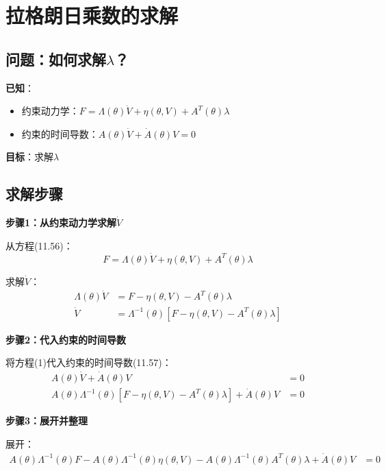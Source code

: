 \documentclass[12pt,a4paper]{article}
\begin{document}
\section{拉格朗日乘数的求解}

\subsection{问题：如何求解$\lambda$？}

\textbf{已知}：
\begin{itemize}
\item 约束动力学：$F = \Lambda(\theta)\dot{V} + \eta(\theta, V) + A^T(\theta)\lambda$
\item 约束的时间导数：$A(\theta)\dot{V} + \dot{A}(\theta)V = 0$
\end{itemize}

\textbf{目标}：求解$\lambda$

\subsection{求解步骤}

\textbf{步骤1：从约束动力学求解$\dot{V}$}

从方程(11.56)：
\begin{equation}
F = \Lambda(\theta)\dot{V} + \eta(\theta, V) + A^T(\theta)\lambda
\end{equation}

求解$\dot{V}$：
\begin{align}
\Lambda(\theta)\dot{V} &= F - \eta(\theta, V) - A^T(\theta)\lambda \\
\dot{V} &= \Lambda^{-1}(\theta)[F - \eta(\theta, V) - A^T(\theta)\lambda] \tag{1}
\end{align}

\textbf{步骤2：代入约束的时间导数}

将方程(1)代入约束的时间导数(11.57)：
\begin{align}
A(\theta)\dot{V} + \dot{A}(\theta)V &= 0 \\
A(\theta)\Lambda^{-1}(\theta)[F - \eta(\theta, V) - A^T(\theta)\lambda] + \dot{A}(\theta)V &= 0
\end{align}

\textbf{步骤3：展开并整理}

展开：
\begin{align}
A(\theta)\Lambda^{-1}(\theta)F - A(\theta)\Lambda^{-1}(\theta)\eta(\theta, V) - A(\theta)\Lambda^{-1}(\theta)A^T(\theta)\lambda + \dot{A}(\theta)V &= 0
\end{align}
\end{document}
